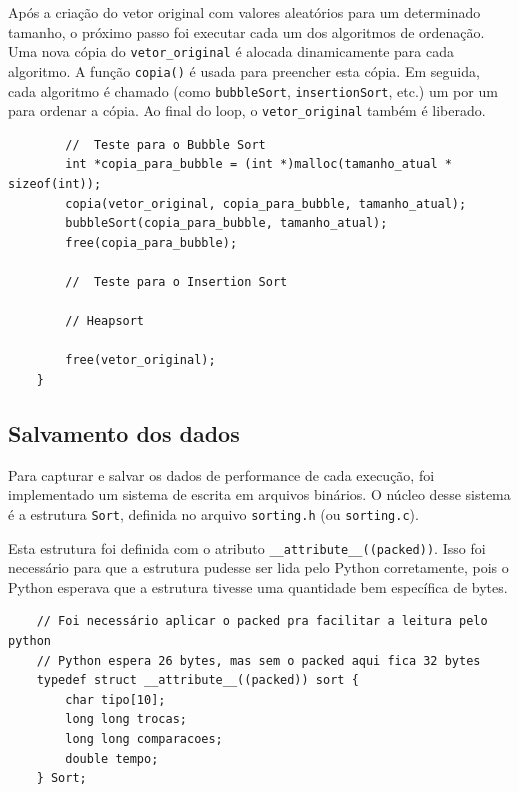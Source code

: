 \documentclass[a4paper]{article}
\begin{document}
    Após a criação do vetor original com valores aleatórios para um determinado tamanho, o próximo passo foi executar cada um dos algoritmos de ordenação. Uma nova cópia do \texttt{vetor\_original} é alocada dinamicamente para cada algoritmo. A função \texttt{copia()} é usada para preencher esta cópia.
    Em seguida, cada algoritmo é chamado (como \texttt{bubbleSort}, \texttt{insertionSort}, etc.) um por um para ordenar a cópia.
    Ao final do loop, o \texttt{vetor\_original} também é liberado.

    \begin{verbatim}
        //  Teste para o Bubble Sort
        int *copia_para_bubble = (int *)malloc(tamanho_atual * sizeof(int));
        copia(vetor_original, copia_para_bubble, tamanho_atual);
        bubbleSort(copia_para_bubble, tamanho_atual);
        free(copia_para_bubble);

        //  Teste para o Insertion Sort

        // Heapsort

        free(vetor_original);
    }
    \end{verbatim}

    \subsection{Salvamento dos dados}\label{subsec:salvamento-dos-dados}

    Para capturar e salvar os dados de performance de cada execução, foi implementado um sistema de escrita em arquivos binários. O núcleo desse sistema é a estrutura \texttt{Sort}, definida no arquivo \texttt{sorting.h} (ou \texttt{sorting.c}).

    Esta estrutura foi definida com o atributo \texttt{\_\_attribute\_\_((packed))}. Isso foi necessário para que a estrutura pudesse ser lida pelo Python corretamente, pois o Python esperava que a estrutura tivesse uma quantidade bem específica de bytes.


    \begin{verbatim}
    // Foi necessário aplicar o packed pra facilitar a leitura pelo python
    // Python espera 26 bytes, mas sem o packed aqui fica 32 bytes
    typedef struct __attribute__((packed)) sort {
        char tipo[10];
        long long trocas;
        long long comparacoes;
        double tempo;
    } Sort;
    \end{verbatim}
\end{document}
